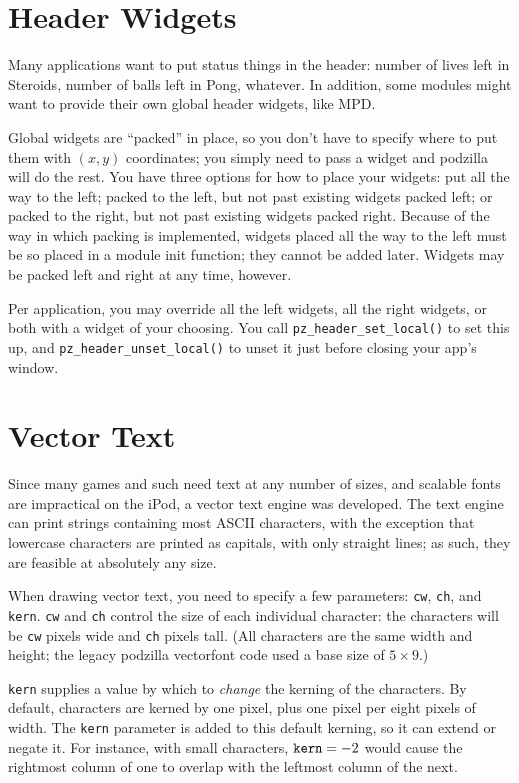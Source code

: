 \documentclass[12pt,letterpaper]{report}
\begin{document}
\section{Header Widgets}
Many applications want to put status things in the header: number of lives left in Steroids,
number of balls left in Pong, whatever. In addition, some modules might want to provide their
own global header widgets, like MPD.

Global widgets are ``packed'' in place, so you don't have to specify where to put them with $(x,y)$
coordinates; you simply need to pass a widget and podzilla will do the rest. You have three
options for how to place your widgets: put all the way to the left; packed to the left, but not past
existing widgets packed left; or packed to the right, but not past existing widgets packed right.
Because of the way in which packing is implemented, widgets placed all the way to the left
must be so placed in a module init function; they cannot be added later. Widgets may be
packed left and right at any time, however.

Per application, you may override all the left widgets, all the right widgets, or both with
a widget of your choosing. You call \verb|pz_header_set_local()| to set this up, and
\verb|pz_header_unset_local()| to unset it just before closing your app's window.

\section{Vector Text}
Since many games and such need text at any number of sizes, and scalable fonts are impractical
on the iPod, a vector text engine was developed. The text engine can print strings containing
most ASCII characters, with the exception that lowercase characters are printed as capitals,
with only straight lines; as such, they are feasible at absolutely any size.

When drawing vector text, you need to specify a few parameters: \verb|cw|, \verb|ch|, and
\verb|kern|. \verb|cw| and \verb|ch| control the size of each individual character:
the characters will be \verb|cw| pixels wide and \verb|ch| pixels tall. (All characters
are the same width and height; the legacy podzilla vectorfont code used a base size of
$5\times9$.)

\verb|kern| supplies a value by which to {\it change} the kerning of the characters.
By default, characters are kerned by one pixel, plus one pixel per eight pixels of width.
The \verb|kern| parameter is added to this default kerning, so it can extend or negate it.
For instance, with small characters, $\verb|kern| = -2$ would cause the rightmost column
of one to overlap with the leftmost column of the next.
\end{document}
